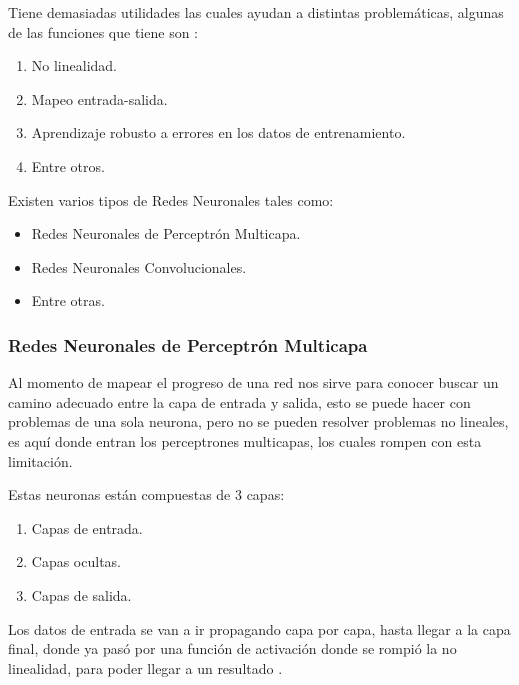         Tiene demasiadas utilidades las cuales ayudan a distintas problemáticas, algunas de las funciones que tiene son \cite{liu2015}:

        \begin{enumerate}
            \item No linealidad.
            \item Mapeo entrada-salida.
            \item Aprendizaje robusto a errores en los datos de entrenamiento. 
            \item Entre otros.
        \end{enumerate}

        Existen varios tipos de Redes Neuronales tales como: 
        \begin{itemize}
            \item Redes Neuronales de Perceptr\'on Multicapa.
            \item Redes Neuronales Convolucionales.
            \item Entre otras.
        \end{itemize}
    
        \subsubsection{Redes Neuronales de Perceptr\'on Multicapa}

            Al momento de mapear el progreso de una red nos sirve para conocer buscar un camino adecuado entre la capa de entrada y salida, esto se puede hacer 
            con problemas de una sola neurona, pero no se pueden resolver problemas no lineales, es aqu\'i donde entran los perceptrones
            multicapas, los cuales rompen con esta limitaci\'on.

            Estas neuronas est\'an compuestas de 3 capas:
            \begin{enumerate}
                \item Capas de entrada.
                \item Capas ocultas.
                \item Capas de salida.
            \end{enumerate}

            Los datos de entrada se van a ir propagando capa por capa, hasta llegar a la capa final, donde ya pas\'o
            por una funci\'on de activaci\'on donde se rompió la no linealidad, para poder llegar a un resultado \cite{liu2015}.

